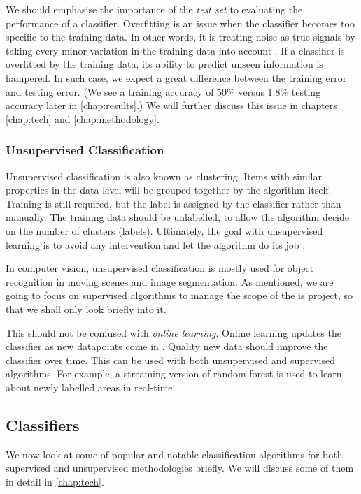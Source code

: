 We should emphasise the importance of the \textit{test set} to evaluating the performance of a classifier. Overfitting is an issue when the classifier becomes too specific to the training data. In other words, it is treating noise as true signals by taking every minor variation in the training data into account \cite{mur-book}. If a classifier is overfitted by the training data, its ability to predict unseen information is hampered. In such case, we expect a great difference between the training error and testing error. (We see a training accuracy of 50\% versus 1.8\% testing accuracy later in \autoref{chap:results}.) We will further discuss this issue in chapters \ref{chap:tech} and \ref{chap:methodology}. 


\subsubsection{Unsupervised Classification} \label{sssec:unsupervised_overview}
Unsupervised classification is also known as clustering. Items with similar properties in the data level will be grouped together by the algorithm itself. Training is still required, but the label is assigned by the classifier rather than manually. The training data should be unlabelled, to allow the algorithm decide on the number of clusters (labels). Ultimately, the goal with unsupervised learning is to avoid any intervention and let the algorithm do its job \cite{hall-notes}. 

In computer vision, unsupervised classification is mostly used for object recognition in moving scenes and image segmentation. As mentioned, we are going to focus on supervised algorithms to manage the scope of the is project, so that we shall only look briefly into it. 

This should not be confused with \textit{online learning}. Online learning updates the classifier as new datapoints come in \cite{mur-book}. Quality new data should improve the classifier over time. This can be used with both unsupervised and supervised algorithms. For example, a streaming version of random forest is used to learn about newly labelled areas in real-time.


\newpage
\subsection{Classifiers} \label{ssec:classifiers}
We now look at some of popular and notable classification algorithms for both supervised and unsupervised methodologies briefly. We will discuss some of them in detail in \autoref{chap:tech}.

